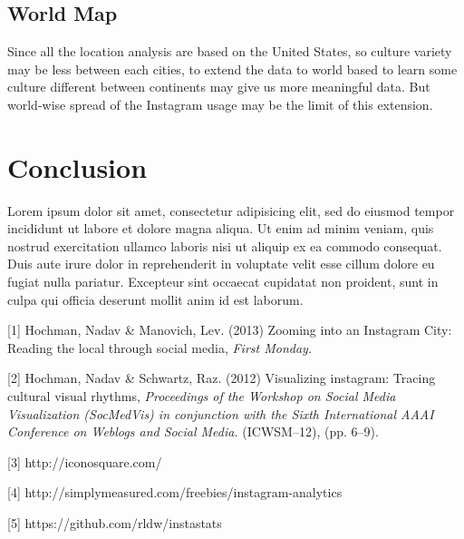 \documentclass[conference]{acmsiggraph}
\begin{document}
\subsection{World Map}
Since all the location analysis are based on the United States, so culture variety may be less between each cities, to extend the data to world based to learn some culture different between continents may give us more meaningful data. But world-wise spread of the Instagram usage may be the limit of this extension.

\section{Conclusion}

Lorem ipsum dolor sit amet, consectetur adipisicing elit, sed do
eiusmod tempor incididunt ut labore et dolore magna aliqua. Ut enim ad
minim veniam, quis nostrud exercitation ullamco laboris nisi ut
aliquip ex ea commodo consequat. Duis aute irure dolor in
reprehenderit in voluptate velit esse cillum dolore eu fugiat nulla
pariatur. Excepteur sint occaecat cupidatat non proident, sunt in
culpa qui officia deserunt mollit anim id est laborum.


\begin{thebibliography}{10}




  [1] Hochman, Nadav \& Manovich, Lev. (2013) Zooming into an Instagram City: Reading the local through social media,
  \emph{ First Monday.}
  
  [2] Hochman, Nadav \& Schwartz, Raz. (2012) Visualizing instagram: Tracing cultural visual rhythms,
  \emph{Proceedings of the Workshop on Social Media Visualization (SocMedVis) in conjunction with the Sixth International AAAI Conference on Weblogs and Social Media.}
  (ICWSM--12), (pp. 6--9).
  
  [3] http://iconosquare.com/
  
  [4] http://simplymeasured.com/freebies/instagram-analytics
  
  [5] https://github.com/rldw/instastats
  
\end{thebibliography}
\end{document}
